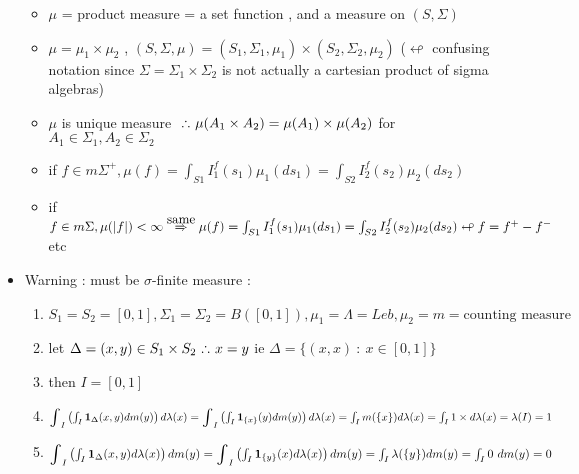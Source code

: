 \documentclass[10pt,landscape,a4paper]{article}
\let\displaystyle\textstyle
\newcommand\myright[1]{\stackrel{{\normalfont\mbox{#1}}}{ \Rightarrow }}
\def\scaleint#1{\vcenter{\hbox{\scaleto[3ex]{\displaystyle\int}{#1}}}}
\newcommand{\myint}{\scaleint{4ex}}
\begin{document}
\begin{multicols*}{3}
\begin{spacing}{0.5}
\begin{itemize}
\begin{itemize}
\item  $\mu$ = product measure = a set function , and a measure on $(S,\Sigma)$ 

\item  $\mu = \mu_1 \times \mu_2$ , $(S,\Sigma,\mu)= (S_1,\Sigma_1,\mu_1) \times (S_2,\Sigma_2,\mu_2) $ ($\looparrowleft$ confusing notation since $\Sigma = \Sigma_1 \times \Sigma_2$ is not actually  a cartesian product of sigma algebras)  

\item $\mu$ is unique measure $\sucht \mu(A_1 \times A_2) = \mu(A_1) \times \mu(A_2)$ for $A_1 \in \Sigma_1, A_2 \in \Sigma_2$

\item if $f \in m\Sigma^+ , \mu(f) = \int_{S1}I_1^f(s_1)\mu_1(ds_1) = \int_{S2}I_2^f(s_2)\mu_2(ds_2)$
\item if $f \in m\Sigma , \mu(|f|) < \infty \myright{same} \mu(f) = \int_{S1}I_1^f(s_1)\mu_1(ds_1) = \int_{S2}I_2^f(s_2)\mu_2(ds_2) \looparrowleft f = f^+ - f^- $ etc
\end{itemize}

\item \colorbox{red!10}{Warning} : must be $\sigma$-finite measure :
\begin{enumerate}
\item $S_1=S_2=[0,1],\Sigma_1=\Sigma_2=B([0,1]),\mu_1=\Lambda=Leb,\mu_2=m=\text{counting measure}$
\item let $\Delta={(x,y)} \in S_1 \times S_2 \sucht  x=y$ ie $\Delta=\{(x,x) \ : \ x \in [0,1] \}$

\item then $I=[0,1]$

\item $\myint_I \left( \int_I \mathbf{1}_{\Delta}(x,y) dm(y) \right) d\lambda(x) \\= \myint_I \left( \int_I \mathbf{1}_{\{x\}}(y) dm(y) \right) d\lambda(x) \\= \int_I m(\{x\}) d\lambda(x) \\= \int_I 1 \times d\lambda(x) \\= \lambda(I)=1 $

\item $\myint_I \left( \int_I \mathbf{1}_{\Delta}(x,y) d\lambda(x) \right) dm(y) \\= \myint_I \left( \int_I \mathbf{1}_{\{y\}}(x) d\lambda(x) \right) dm(y) \\= \int_I \lambda(\{y\}) dm(y) \\= \int_I 0 \ dm(y)=0$


\end{enumerate}
\end{itemize}
\end{spacing}
\end{multicols*}
\end{document}
